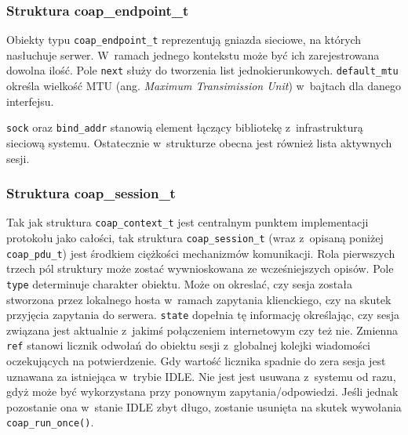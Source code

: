 
\subsubsection{Struktura coap\_endpoint\_t}

Obiekty typu \verb|coap_endpoint_t| reprezentują gniazda sieciowe, na których nasłuchuje serwer. W~ramach jednego kontekstu może być ich zarejestrowana dowolna ilość. Pole \verb|next| służy do tworzenia list jednokierunkowych. \verb|default_mtu| określa wielkość MTU (ang. \textit{Maximum Transimission Unit}) w~bajtach dla danego interfejsu. 

\vspace{0.5cm}

\vspace{0.5cm}

\verb|sock| oraz \verb|bind_addr| stanowią element łączący bibliotekę z~infrastrukturą sieciową systemu. Ostatecznie w~strukturze obecna jest również lista aktywnych sesji.




\subsubsection{Struktura coap\_session\_t}

\vspace{0.5cm}

\vspace{0.5cm}

Tak jak struktura \verb|coap_context_t| jest centralnym punktem implementacji protokołu jako całości, tak struktura \verb|coap_session_t| (wraz z~opisaną poniżej \verb|coap_pdu_t|) jest środkiem ciężkości mechanizmów komunikacji. Rola pierwszych trzech pól struktury może zostać wywnioskowana ze wcześniejszych opisów. Pole \verb|type| determinuje charakter obiektu. Może on okreslać, czy sesja została stworzona przez lokalnego hosta w~ramach zapytania klienckiego, czy na skutek przyjęcia zapytania do serwera. \verb|state| dopełnia tę informację określając, czy sesja związana jest aktualnie z~jakimś połączeniem internetowym czy też nie. Zmienna \verb|ref| stanowi licznik odwołań do obiektu sesji z~globalnej kolejki wiadomości oczekujących na potwierdzenie. Gdy wartość licznika spadnie do zera sesja jest uznawana za istniejąca w~trybie IDLE. Nie jest jest usuwana z~systemu od razu, gdyż może być wykorzystana przy ponownym zapytania/odpowiedzi. Jeśli jednak pozostanie ona w~stanie IDLE zbyt długo, zostanie usunięta na skutek wywołania \verb|coap_run_once()|.

